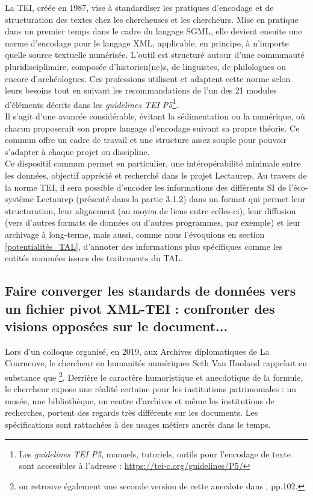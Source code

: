 La TEI, créée en 1987, vise à standardiser les pratiques d'encodage et de structuration des textes chez les chercheuses et les chercheurs. Mise en pratique dans un premier temps dans le cadre du langage SGML, elle devient ensuite une norme d'encodage pour le langage XML, applicable, en principe, à n'importe quelle source textuelle numérisée. L'outil est structuré autour d'une communauté pluridisciplinaire, composée d'historien(ne)s, de linguistes, de philologues ou encore d'archéologues. Ces professions utilisent et adaptent cette norme selon leurs besoins tout en suivant les recommandations de l'un des 21 modules d'éléments décrits dans les \textit{guidelines TEI P5}\footnote{Les \textit{guidelines TEI P5}, manuels, tutoriels, outils pour l'encodage de texte sont accessibles à l'adresse : \url{https://tei-c.org/guidelines/P5/}}.\\

Il s'agit d'une avancée considérable, évitant la sédimentation ou la  numérique, où chacun proposerait son propre langage d'encodage suivant sa propre théorie. Ce  commun offre un cadre de travail et une structure assez souple pour pouvoir s'adapter à chaque projet ou discipline.\\

Ce dispositif commun permet en particulier, une intéropérabilité minimale entre les données, objectif apprécié et recherché dans le projet Lectaurep. Au travers de la norme TEI, il sera possible d'encoder les informations des différents SI de l'éco-système Lectaurep (présenté dans la partie 3.1.2) dans un format qui permet leur structuration, leur alignement (au moyen de liens entre celles-ci), leur diffusion (vers d'autres formats de données ou d'autres programmes, par exemple) et leur archivage à long-terme, mais aussi, comme nous l'évoquions en section \ref{potentialités_TAL}, d'annoter des informations plus spécifiques comme les entités nommées issues des traitements du TAL. 

\subsection{Faire converger les standards de données vers un fichier pivot XML-TEI : confronter des visions opposées sur le document...}\label{negatif_TEI}

Lors d'un colloque organisé, en 2019, aux Archives diplomatiques de La Courneuve, le chercheur en humanités numériques Seth Van Hooland rappelait en substance que \footnote{\cite{hooland_application_2019} on retrouve également 
une seconde version de cette anecdote dans \cite{gillet_introduction_2016}, pp.102.}. Derrière le caractère humoristique et anecdotique de la formule, le chercheur expose une réalité certaine pour les institutions patrimoniales : un musée, une bibliothèque, un centre d'archives et même les institutions de recherches, portent des regards très différents sur les documents. Les spécifications sont rattachées à des usages métiers ancrés dans le temps.\\

